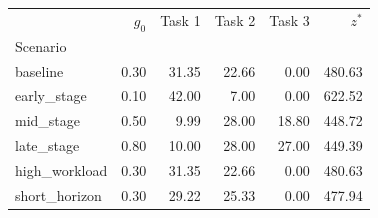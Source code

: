 \begin{tabular}{lrrrrr}
\toprule
 & $g_0$ & Task 1 & Task 2 & Task 3 & $z^*$ \\
Scenario &  &  &  &  &  \\
\midrule
baseline & 0.30 & 31.35 & 22.66 & 0.00 & 480.63 \\
early_stage & 0.10 & 42.00 & 7.00 & 0.00 & 622.52 \\
mid_stage & 0.50 & 9.99 & 28.00 & 18.80 & 448.72 \\
late_stage & 0.80 & 10.00 & 28.00 & 27.00 & 449.39 \\
high_workload & 0.30 & 31.35 & 22.66 & 0.00 & 480.63 \\
short_horizon & 0.30 & 29.22 & 25.33 & 0.00 & 477.94 \\
\bottomrule
\end{tabular}
